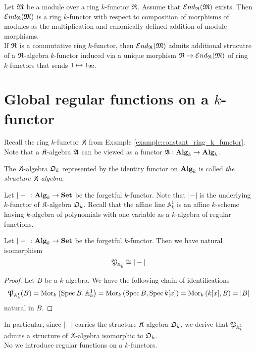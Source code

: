 \begin{example}\label{example:endomorphisms_of_module_k_functor}
Let ${\mathfrak M}$ be a module over a ring $k$-functor ${\mathfrak R}$. Assume that ${\mathcal E} nd_{{\mathfrak R}}({\mathfrak M})$ exists. Then ${\mathcal E} nd_{{\mathfrak R}}({\mathfrak M})$ is a ring $k$-functor with respect to composition of morphisms of modules as the multiplication and canonically defined addition of module morphisms.\\
If ${\mathfrak R}$ is a commutative ring $k$-functor, then ${\mathcal E} nd_{{\mathfrak R}}({\mathfrak M})$ admits additional strucutre of a ${\mathfrak R}$-algebra $k$-functor induced via a unique morphism ${\mathfrak R}\rightarrow {\mathcal E} nd_{{\mathfrak R}}({\mathfrak M})$ of ring $k$-functors that sends $1\mapsto 1_{{\mathfrak M}}$.
\end{example}

\section{Global regular functions on a $k$-functor}
\noindent
Recall the ring $k$-functor ${\mathfrak K}$ from Example \ref{example:constant_ring_k_functor}. Note that a ${\mathfrak K}$-algebra ${\mathfrak A}$ can be viewed as a functor ${\mathfrak A}:\mathbf{Alg}_k\rightarrow \mathbf{Alg}_k$.

\begin{definition}
The ${\mathfrak K}$-algebra ${\mathfrak O}_k$ represented by the identity functor on $\mathbf{Alg}_k$ is called \textit{the structure ${\mathfrak K}$-algebra}.
\end{definition}
\noindent
Let $|-|:\mathbf{Alg}_k\rightarrow \mathbf{Set}$ be the forgetful $k$-functor. Note that $|-|$ is the underlying $k$-functor of ${\mathfrak K}$-algebra ${\mathfrak O}_k$. Recall that the affine line $\mathbb{A}^1_k$ is an affine $k$-scheme having $k$-algebra of polynomials with one variable as a $k$-algebra of regular functions.

\begin{fact}\label{fact:affineline_as_forgetfulfunctor}
Let $|-|:\mathbf{Alg}_k\rightarrow \mathbf{Set}$ be the forgetful $k$-functor. Then we have natural isomorphism
$${\mathfrak P}_{\mathbb{A}^1_k} \cong |-|$$
\end{fact}
\begin{proof}
Let $B$ be a $k$-algebra. We have the following chain of identifications
$${\mathfrak P}_{\mathbb{A}^1_k}(B) = \mathrm{Mor}_k\left(\mathrm{Spec}\, B, \mathbb{A}^1_k\right) = \mathrm{Mor}_k\left(\mathrm{Spec}\, B, \mathrm{Spec}\, k[x]\right) = \mathrm{Mor}_k\left(k[x], B\right) = |B|$$
natural in $B$.
\end{proof}
\noindent
In particular, since $|-|$ carries the structure ${\mathfrak K}$-algebra ${\mathfrak O}_k$, we derive that ${\mathfrak P}_{\mathbb{A}^1_k}$ admits a structure of ${\mathfrak K}$-algebra isomorphic to ${\mathfrak O}_k$.\\
No we introduce regular functions on a $k$-functors.

